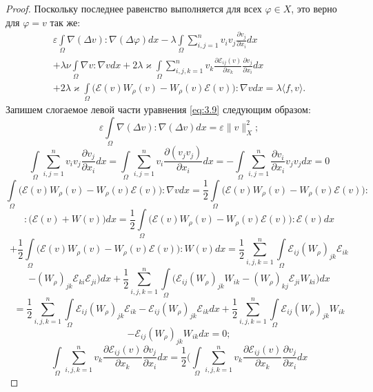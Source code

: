 \begin{proof}
    Поскольку последнее равенство выполняется для всех $\varphi\in X$, это верно для $\varphi=v$ так же:
    \begin{equation}\label{eq:3.9}
        \begin{gathered}
            \varepsilon\int\limits_{\Omega}\nabla(\Delta v):\nabla(\Delta\varphi)dx-\lambda\int\limits_{\Omega}\sum_{i,j=1}^n v_iv_j\frac{\partial v_j}{\partial x_i}dx \\
            +\lambda\nu\int\limits_{\Omega}\nabla v:\nabla vdx+2\lambda\varkappa\int\limits_{\Omega}\sum_{i,j,k=1}^n v_k\frac{\partial\mathcal{E}_{ij}(v)}{\partial x_k}\frac{\partial v_j}{\partial x_i}dx \\
            +2\lambda\varkappa\int\limits_{\Omega}\bigg(\mathcal{E}(v)W_{\rho}(v)-W_{\rho}(v)\mathcal{E}(v)\bigg):\nabla v dx=\lambda\langle f, v\rangle.
        \end{gathered}
    \end{equation}
Запишем слогаемое левой части уравнения \ref{eq:3.9} следующим образом:
$$\varepsilon\int\limits_{\Omega}\nabla(\Delta v):\nabla(\Delta v)dx=\varepsilon\|v\|^2_X;$$
$$\int\limits_{\Omega}\sum_{i,j=1}^n v_iv_j\frac{\partial v_j}{\partial x_i}dx=\int\limits_{\Omega}\sum_{i,j=1}^n v_i
\frac{\partial (v_jv_j)}{\partial x_i}dx=-\int\limits_{\Omega}\sum_{i,j=1}^n\frac{\partial v_i}{\partial x_i}v_jv_jdx=0$$
$$\int\limits_{\Omega}\bigg(\mathcal{E}(v)W_{\rho}(v)-W_{\rho}(v)\mathcal{E}(v)\bigg):\nabla v dx=\frac{1}{2}\int\limits_{\Omega}\bigg(\mathcal{E}(v)
W_{\rho}(v)-W_{\rho}(v)\mathcal{E}(v)\bigg):$$
$$:\bigg(\mathcal{E}(v)+W(v)\bigg)dx=\frac{1}{2}\int\limits_{\Omega}\bigg(\mathcal{E}(v)W_{\rho}(v)-W_{\rho}(v)\mathcal{E}(v)\bigg):\mathcal{E}(v)dx$$
$$+\frac{1}{2}\int\limits_{\Omega}\bigg(\mathcal{E}(v)W_{\rho}(v)-W_{\rho}(v)\mathcal{E}(v)\bigg):W(v)dx=\frac{1}{2}\sum_{i,j,k=1}^n\int\limits_{\Omega}
\mathcal{E}_{ij}(W_{\rho})_{jk}\mathcal{E}_{ik}$$
$$-(W_{\rho})_{jk}\mathcal{E}_{ki}\mathcal{E}_{ji}\bigg)dx+\frac{1}{2}\sum_{i,j,k=1}^n\int\limits_{\Omega}\bigg(\mathcal{E}_{ij}(W_{\rho})_{jk}W_{ik}-
(W_{\rho})_{kj}\mathcal{E}_{ji}W_{ki}\bigg) dx$$
$$=\frac{1}{2}\sum_{i,j,k=1}^n\int\limits_{\Omega}\mathcal{E}_{ij}(W_{\rho})_{jk}\mathcal{E}_{ik}-\mathcal{E}_{ij}(W_{\rho})_{jk}\mathcal{E}_{ik}dx+
\frac{1}{2}\sum_{i,j,k=1}^n\int\limits_{\Omega}\mathcal{E}_{ij}(W_{\rho})_{jk}W_{ik}$$
$$-\mathcal{E}_{ij}(W_{\rho})_{jk}W_{ik}dx=0;$$
$$\int\limits_{\Omega}\sum_{i,j,k=1}^n v_k\frac{\partial\mathcal{E}_{ij}(v)}{\partial x_k}\frac{\partial v_j}{\partial x_i}dx=\frac{1}{2}\bigg(
\int\limits_{\Omega}\sum_{i,j,k=1}^n v_k\frac{\partial\mathcal{E}_{ij}(v)}{\partial x_k}\frac{\partial v_j}{\partial x_i}dx$$

\end{proof}
